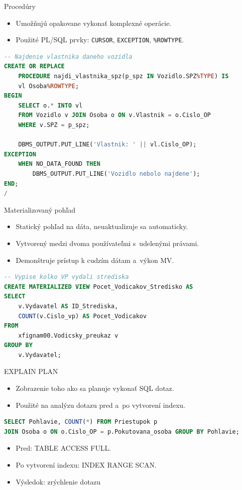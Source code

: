 \documentclass[10pt, hyperref={unicode}]{beamer}
\begin{document}
\begin{frame}[fragile]{Procedúry}
    \begin{itemize}
        \item Umožňujú opakovane vykonať komplexné operácie.
        \item Použité PL/SQL prvky: \texttt{CURSOR}, \texttt{EXCEPTION}, \verb|%ROWTYPE|.
    \end{itemize}
    \begin{lstlisting}[language=SQL, title={~}]
-- Najdenie vlastnika daneho vozidla
CREATE OR REPLACE 
    PROCEDURE najdi_vlastnika_spz(p_spz IN Vozidlo.SPZ%TYPE) IS
    vl Osoba%ROWTYPE;
BEGIN
    SELECT o.* INTO vl
    FROM Vozidlo v JOIN Osoba o ON v.Vlastnik = o.Cislo_OP
    WHERE v.SPZ = p_spz;

    DBMS_OUTPUT.PUT_LINE('Vlastnik: ' || vl.Cislo_OP);
EXCEPTION
    WHEN NO_DATA_FOUND THEN
        DBMS_OUTPUT.PUT_LINE('Vozidlo nebolo najdene');
END;
/
    \end{lstlisting}
\end{frame}

\begin{frame}[fragile]{Materializovaný pohľad}
    \begin{itemize}
        \item Statický pohľad na dáta, neuaktualizuje sa automaticky.
        \item Vytvorený medzi dvoma používateľmi s~udelenými právami.
        \item Demonštruje prístup k cudzím dátam a~výkon MV.
    \end{itemize}
    \begin{lstlisting}[language=SQL, title={~}]
-- Vypise kolko VP vydali strediska
CREATE MATERIALIZED VIEW Pocet_Vodicakov_Stredisko AS
SELECT 
    v.Vydavatel AS ID_Strediska,
    COUNT(v.Cislo_vp) AS Pocet_Vodicakov
FROM 
    xfignam00.Vodicsky_preukaz v
GROUP BY 
    v.Vydavatel;
    \end{lstlisting}
\end{frame}

\begin{frame}[fragile]{EXPLAIN PLAN}
    \begin{itemize}
        \item Zobrazenie toho ako sa planuje vykonať SQL dotaz.
        \item Použité na analýzu dotazu pred a~po vytvorení indexu.
    \end{itemize}
    \begin{lstlisting}[language=SQL, title={~}]
SELECT Pohlavie, COUNT(*) FROM Priestupok p
JOIN Osoba o ON o.Cislo_OP = p.Pokutovana_osoba GROUP BY Pohlavie;
    \end{lstlisting}
    \begin{itemize}
        \item Pred: TABLE ACCESS FULL.
        \item Po vytvorení indexu: INDEX RANGE SCAN.
        \item Výsledok: zrýchlenie dotazu
    \end{itemize}
\end{frame}
\end{document}

